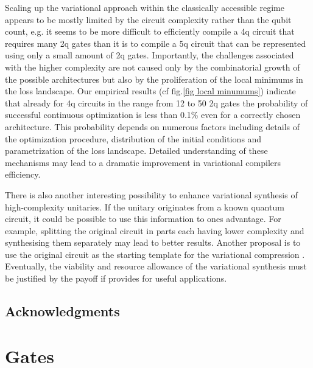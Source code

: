 \documentclass[amsfonts, amssymb, aps, nofootinbib, twocolumn]{revtex4-2}
\begin{document}
Scaling up the variational approach within the classically accessible regime appears to be mostly limited by the circuit complexity rather than the qubit count, e.g. it seems to be more difficult to efficiently compile a 4q circuit that requires many 2q gates than it is to compile a 5q circuit that can be represented using only a small amount of 2q gates. Importantly, the challenges associated with the higher complexity are not caused only by the combinatorial growth of the possible architectures but also by the proliferation of the local minimums in the loss landscape. Our empirical results (cf fig.\ref{fig local minumums}) indicate that already for 4q circuits in the range from 12 to 50 2q gates the probability of successful continuous optimization is less than 0.1\% even for a correctly chosen architecture. This probability depends on numerous factors including details of the optimization procedure, distribution of the initial conditions and parametrization of the loss landscape. Detailed understanding of these mechanisms may lead to a dramatic improvement in variational compilers efficiency.

There is also another interesting possibility to enhance variational synthesis of high-complexity unitaries. If the unitary originates from a known quantum circuit, it could be possible to use this information to ones advantage. For example, splitting the original circuit in parts each having lower complexity and synthesising them separately may lead to better results. Another proposal is to use the original circuit as the starting template for the variational compression \cite{Rakyta2022}. Eventually, the viability and resource allowance of the variational synthesis must be justified by the payoff if provides for useful applications.


\subsection*{Acknowledgments}

\appendix
\section{Gates}
\end{document}
